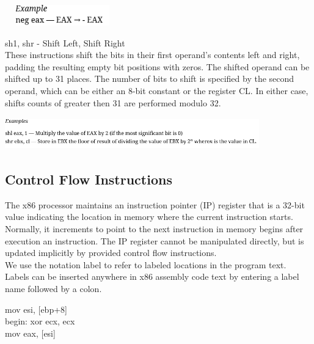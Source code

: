 \documentclass[12pt]{extarticle}
\begin{document}
 \begin{center}

    \includegraphics[width=5cm, height=0.9cm]{neg}
    
 \end{center}

 sh1, shr - Shift Left, Shift Right \\ 

 These instructions shift the bits in their first operand's contents left and right, padding the resulting empty bit positions with zeros. The shifted operand can be shifted up to 31 places. The number of bits to shift is specified by the second operand, which can be either an 8-bit constant or the register CL. In either case, shifts counts of greater then 31 are performed modulo 32. 

 \begin{center}

    \includegraphics[width=11cm, height=1.4cm]{sh}
    
 \end{center}

 \subsection{Control Flow Instructions}

 The x86 processor maintains an instruction pointer (IP) register that is a 32-bit value indicating the location in memory where the current instruction starts. Normally, it increments to point to the next instruction in memory begins after execution an instruction. The IP register cannot be manipulated directly, but is updated implicitly by provided control flow instructions. 
 \\ We use the notation label to refer to labeled locations in the program text. Labels can be inserted anywhere in x86 assembly code text by entering a label name followed by a colon.

\begin{center}
mov esi, [ebp+8]\\
begin: xor ecx, ecx\\
mov eax, [esi]\\
\end{center}
\end{document}
